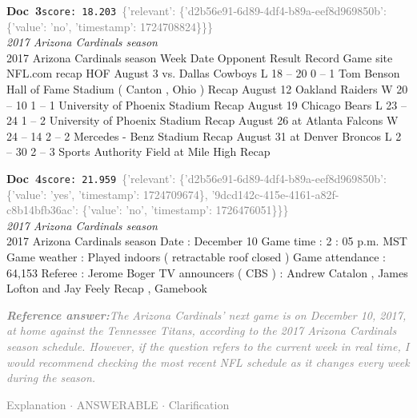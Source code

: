 \documentclass[a4paper,11pt]{article}
\begin{document}
\begin{docenv}
{\footnotesize\textcolor{doccolor}{\textbf{Doc~3}}}\hfill{\tiny\texttt{score:~18.203}}\ {\tiny\textcolor{gray}{\{'relevant': \{'d2b56e91-6d89-4df4-b89a-eef8d969850b': \{'value': 'no', 'timestamp': 1724708824\}\}\}}}\\[3pt]
{\small\textit{2017 Arizona Cardinals season}}\\[2pt]
\vspace{2pt}
{\footnotesize 2017 Arizona Cardinals season
Week Date Opponent Result Record Game site NFL.com recap HOF August 3 vs. Dallas Cowboys L 18 -- 20 0 -- 1 Tom Benson Hall of Fame Stadium ( Canton , Ohio ) Recap August 12 Oakland Raiders W 20 -- 10 1 -- 1 University of Phoenix Stadium Recap August 19 Chicago Bears L 23 -- 24 1 -- 2 University of Phoenix Stadium Recap August 26 at Atlanta Falcons W 24 -- 14 2 -- 2 Mercedes - Benz Stadium Recap August 31 at Denver Broncos L 2 -- 30 2 -- 3 Sports Authority Field at Mile High Recap}
\end{docenv}
\begin{docenv}
{\footnotesize\textcolor{doccolor}{\textbf{Doc~4}}}\hfill{\tiny\texttt{score:~21.959}}\ {\tiny\textcolor{gray}{\{'relevant': \{'d2b56e91-6d89-4df4-b89a-eef8d969850b': \{'value': 'yes', 'timestamp': 1724709674\}, '9dcd142c-415e-4161-a82f-c8b14bfb36ac': \{'value': 'no', 'timestamp': 1726476051\}\}\}}}\\[3pt]
{\small\textit{2017 Arizona Cardinals season}}\\[2pt]
\vspace{2pt}
{\footnotesize 2017 Arizona Cardinals season
Date : December 10 Game time : 2 : 05 p.m. MST Game weather : Played indoors ( retractable roof closed ) Game attendance : 64,153 Referee : Jerome Boger TV announcers ( CBS ) : Andrew Catalon , James Lofton and Jay Feely Recap , Gamebook}
\end{docenv}
\begin{refanswerenv}
{\footnotesize\textit{\textcolor{gray}{\textbf{Reference answer:}\enspace The Arizona Cardinals' next game is on December 10, 2017, at home against the Tennessee Titans, according to the 2017 Arizona Cardinals season schedule. However, if the question refers to the current week in real time, I would recommend checking the most recent NFL schedule as it changes every week during the season.}}}
\end{refanswerenv}
\vspace{0.5em}
\hfill{\tiny\textcolor{gray}{Explanation $\cdot$ ANSWERABLE $\cdot$ Clarification}}
\end{document}
